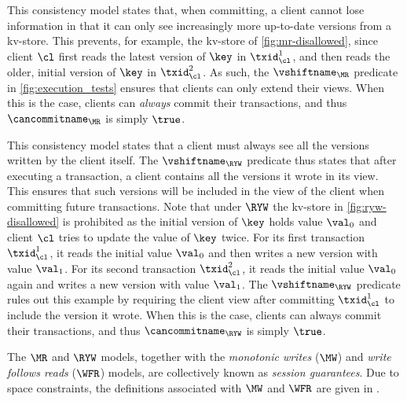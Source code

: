 This consistency model states that,  when committing, a client
cannot lose information in that it can only see increasingly more up-to-date versions from a kv-store.
This prevents, for example, the kv-store of \cref{fig:mr-disallowed},
since client \(\cl\) first reads the latest version of \(\key\) in \(\txid_{\cl}^{1}\), 
and then reads the older, initial version of \(\key\) in \(\txid_{\cl}^{2}\).  
As such, the \(\vshiftname_{\MR}\) predicate in \cref{fig:execution_tests} ensures that clients  can only extend their views. 
When this is the case, clients can \emph{always} commit their transactions, and thus \(\cancommitname_{\MR}\) is simply \(\true\). 

This consistency model states that a client must always see all the versions written by the client itself. 
The \(\vshiftname_{\RYW}\) predicate thus states that after executing a transaction, a client 
contains all the versions it wrote in its view. This ensures that such versions will be included in the view of the client 
when committing future transactions.
Note that under \(\RYW\) the kv-store in \cref{fig:ryw-disallowed} is prohibited as
the initial version of \(\key\) holds value \(\val_0\) 
and client \(\cl\) tries to update the value of \(\key\) twice.  
For its first transaction \( \txid_{\cl}^1\), it reads the initial value \(\val_0\) and then writes a new version with value \(\val_1\). 
For its second transaction \( \txid_{\cl}^2\), it reads the initial value \(\val_0\) again and writes a new version with value \(\val_1\).
The \(\vshiftname_{\RYW}\) predicate rules out this example by requiring the client view after committing \(\txid_{\cl}^{1}\) to include the version it wrote.  
When this is the case, clients can always commit their transactions, and thus \(\cancommitname_{\RYW}\) is simply \(\true\).

The \(\MR\) and \(\RYW\) models,  together with the \emph{monotonic
  writes} (\(\MW\)) and \emph{write follows reads} (\(\WFR\)) models,  are collectively known as \emph{session guarantees}. 
Due to space constraints, the definitions associated with \(\MW\) and \(\WFR\) are given in \cite{shale-phd}. 



